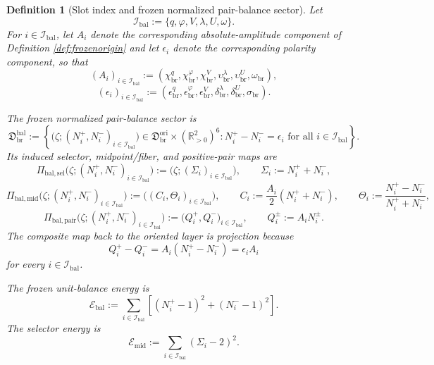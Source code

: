 \documentclass[11pt]{article}
\newcommand{\OriginSector}{\mathfrak D_{\mathrm{br}}^{\mathrm{ori}}}
\newcommand{\AbsReadAmp}{\chi_{\mathrm{br}}^{q}}
\newcommand{\AbsCovAmp}{\chi_{\mathrm{br}}^{\varphi}}
\newcommand{\AbsRelaxAmp}{\chi_{\mathrm{br}}^{V}}
\newcommand{\AbsWellAmp}{\upsilon_{\mathrm{br}}^{\lambda}}
\newcommand{\AbsEqAmp}{\upsilon_{\mathrm{br}}^{U}}
\newcommand{\AbsScaleAmp}{\omega_{\mathrm{br}}}
\newcommand{\PolRead}{\epsilon_{\mathrm{br}}^{q}}
\newcommand{\PolCov}{\epsilon_{\mathrm{br}}^{\varphi}}
\newcommand{\PolRelax}{\epsilon_{\mathrm{br}}^{V}}
\newcommand{\PolWell}{\delta_{\mathrm{br}}^{\lambda}}
\newcommand{\PolEq}{\delta_{\mathrm{br}}^{U}}
\newcommand{\PolScale}{\sigma_{\mathrm{br}}}
\newcommand{\SelEnergy}{\mathscr E_{\mathrm{mid}}}
\newcommand{\MidBalanceSector}{\mathfrak D_{\mathrm{br}}^{\mathrm{bal}}}
\newcommand{\BalSelMap}{\Pi_{\mathrm{bal,sel}}}
\newcommand{\BalMidMap}{\Pi_{\mathrm{bal,mid}}}
\newcommand{\BalPairMap}{\Pi_{\mathrm{bal,pair}}}
\newcommand{\BalEnergy}{\mathscr E_{\mathrm{bal}}}
\newcommand{\BalIndex}{\mathcal I_{\mathrm{bal}}}
\newtheorem{definition}{Definition}
\begin{document}
\begin{definition}[Slot index and frozen normalized pair-balance sector]
\label{def:balance}
Let
\begin{equation}
\BalIndex:=\{q,\varphi,V,\lambda,U,\omega\}.
\label{eq:balindex}
\end{equation}
For \(i\in\BalIndex\), let \(A_i\) denote the corresponding absolute-amplitude component of Definition \ref{def:frozenorigin} and let \(\epsilon_i\) denote the corresponding polarity component, so that
\begin{equation}
(A_i)_{i\in\BalIndex}
:=
(\AbsReadAmp,\AbsCovAmp,\AbsRelaxAmp,\AbsWellAmp,\AbsEqAmp,\AbsScaleAmp),
\label{eq:Aishorthand}
\end{equation}
\begin{equation}
(\epsilon_i)_{i\in\BalIndex}
:=
(\PolRead,\PolCov,\PolRelax,\PolWell,\PolEq,\PolScale).
\label{eq:epsishorthand}
\end{equation}

The frozen normalized pair-balance sector is
\begin{equation}
\MidBalanceSector
:=
\left\{
\bigl(\zeta;(N_i^+,N_i^-)_{i\in\BalIndex}\bigr)
\in
\OriginSector\times(\mathbb R_{>0}^{2})^{6}
:
N_i^+-N_i^-=\epsilon_i
\text{ for all }i\in\BalIndex
\right\}.
\label{eq:balsector}
\end{equation}
Its induced selector, midpoint/fiber, and positive-pair maps are
\begin{equation}
\BalSelMap\bigl(\zeta;(N_i^+,N_i^-)_{i\in\BalIndex}\bigr)
:=
\bigl(\zeta;(\Sigma_i)_{i\in\BalIndex}\bigr),
\qquad
\Sigma_i:=N_i^++N_i^-,
\label{eq:balselmap}
\end{equation}
\begin{equation}
\BalMidMap\bigl(\zeta;(N_i^+,N_i^-)_{i\in\BalIndex}\bigr)
:=
\bigl((C_i,\Theta_i)_{i\in\BalIndex}\bigr),
\qquad
C_i:=\frac{A_i}{2}(N_i^++N_i^-),
\qquad
\Theta_i:=\frac{N_i^+-N_i^-}{N_i^++N_i^-},
\label{eq:balmidmap}
\end{equation}
\begin{equation}
\BalPairMap\bigl(\zeta;(N_i^+,N_i^-)_{i\in\BalIndex}\bigr)
:=
\bigl(Q_i^+,Q_i^-\bigr)_{i\in\BalIndex},
\qquad
Q_i^\pm:=A_iN_i^\pm.
\label{eq:balpairmap}
\end{equation}
The composite map back to the oriented layer is projection because
\begin{equation}
Q_i^+-Q_i^- = A_i(N_i^+-N_i^-)=\epsilon_i A_i
\label{eq:balprojection}
\end{equation}
for every \(i\in\BalIndex\).

The frozen unit-balance energy is
\begin{equation}
\BalEnergy
:=
\sum_{i\in\BalIndex}
\left[(N_i^+-1)^2+(N_i^--1)^2\right].
\label{eq:balenergy}
\end{equation}
The selector energy is
\begin{equation}
\SelEnergy
:=
\sum_{i\in\BalIndex}(\Sigma_i-2)^2.
\label{eq:selenergy}
\end{equation}
\end{definition}
\end{document}
